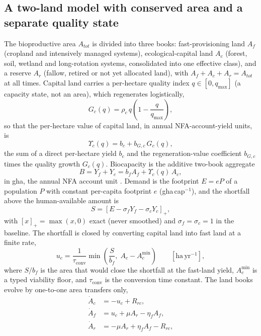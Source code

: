 \documentclass[preprint,12pt,authoryear]{elsarticle}
\newcommand{\pos}[1]{\left[#1\right]_+}
\newcommand{\Ups}{\Upsilon_c}
\newcommand{\Acmin}{A_c^{\min}}
\newcommand{\tconv}{\tau_{\mathrm{conv}}}
\begin{document}
\subsection{A two-land model with conserved area and a separate quality state}\label{sec:equations}

The bioproductive area $A_{tot}$ is divided into three books: fast-provisioning land $A_f$ (cropland and intensively managed systems), ecological-capital land $A_c$ (forest, soil, wetland and long-rotation systems, consolidated into one effective class), and a reserve $A_r$ (fallow, retired or not yet allocated land), with $A_f+A_c+A_r=A_{tot}$ at all times. Capital land carries a per-hectare quality index $q\in[0,q_{\max}]$ (a capacity state, not an area), which regenerates logistically,
\begin{equation}\label{eq:Gc}
G_c(q)=\rho_c\,q\left(1-\frac{q}{q_{\max}}\right),
\end{equation}
so that the per-hectare value of capital land, in annual NFA-account-yield units, is
\begin{equation}\label{eq:Ups}
\Ups(q)=b_c+b_{G,c}\,G_c(q),
\end{equation}
the sum of a direct per-hectare yield $b_c$ and the regeneration-value coefficient $b_{G,c}$ times the quality growth $G_c(q)$. Biocapacity is the additive two-book aggregate
\begin{equation}\label{eq:B}
B=Y_f+Y_c=b_f A_f+\Ups(q)\,A_c ,
\end{equation}
in gha, the annual NFA account unit \citep{GFNStandards2009,GFNGuidebook2019}. Demand is the footprint $E=eP$ of a population $P$ with constant per-capita footprint $e$ (gha\,cap$^{-1}$), and the shortfall above the human-available amount is
\begin{equation}\label{eq:S}
S=\pos{E-\sigma_f Y_f-\sigma_c Y_c},
\end{equation}
with $\pos{x}=\max(x,0)$ exact (never smoothed) and $\sigma_f=\sigma_c=1$ in the baseline. The shortfall is closed by converting capital land into fast land at a finite rate,
\begin{equation}\label{eq:uc}
u_c=\frac{1}{\tconv}\min\!\left(\frac{S}{b_f},\;A_c-\Acmin\right)\qquad[\mathrm{ha\,yr^{-1}}],
\end{equation}
where $S/b_f$ is the area that would close the shortfall at the fast-land yield, $\Acmin$ is a typed viability floor, and $\tconv$ is the conversion time constant. The land books evolve by one-to-one area transfers only,
\begin{align}
\dot A_c&=-u_c+R_{rc},\label{eq:Ac}\\
\dot A_f&=u_c+\mu A_r-\eta_f A_f,\label{eq:Af}\\
\dot A_r&=-\mu A_r+\eta_f A_f-R_{rc},\label{eq:Ar}
\end{align}
\end{document}
